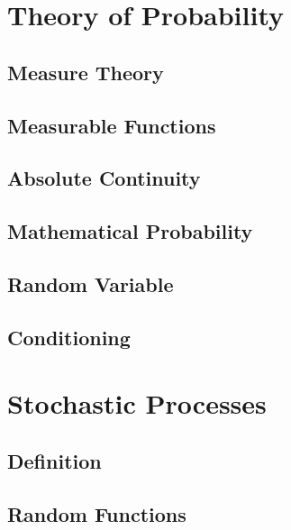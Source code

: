 \documentclass{article}
\begin{document}
\section{Theory of Probability}

\subsection{Measure Theory}

\subsection{Measurable Functions}

\subsection{Absolute Continuity}

\subsection{Mathematical Probability}

\subsection{Random Variable}

\subsection{Conditioning}

\section{Stochastic Processes}

\subsection{Definition}

\subsection{Random Functions}
\end{document}
